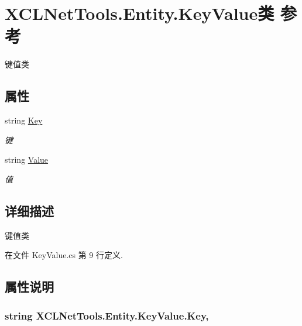 \hypertarget{class_x_c_l_net_tools_1_1_entity_1_1_key_value}{\section{X\-C\-L\-Net\-Tools.\-Entity.\-Key\-Value类 参考}
\label{class_x_c_l_net_tools_1_1_entity_1_1_key_value}
}


键值类  


\subsection*{属性}
\begin{DoxyCompactItemize}
\item 
string \hyperlink{class_x_c_l_net_tools_1_1_entity_1_1_key_value_a33e2f7bfdcc6a1dce560304a4450cf08}{Key}
\begin{DoxyCompactList}\small\item\em 键 \end{DoxyCompactList}\item 
string \hyperlink{class_x_c_l_net_tools_1_1_entity_1_1_key_value_a9ec3c76143930f64c1e0de2074514bae}{Value}
\begin{DoxyCompactList}\small\item\em 值 \end{DoxyCompactList}\end{DoxyCompactItemize}


\subsection{详细描述}
键值类 



在文件 Key\-Value.\-cs 第 9 行定义.



\subsection{属性说明}
\hypertarget{class_x_c_l_net_tools_1_1_entity_1_1_key_value_a33e2f7bfdcc6a1dce560304a4450cf08}{
\subsubsection[{Key}]{\setlength{\rightskip}{0pt plus 5cm}string X\-C\-L\-Net\-Tools.\-Entity.\-Key\-Value.\-Key\hspace{0.3cm}{\ttfamily [get]}, {\ttfamily [set]}}}\label{class_x_c_l_net_tools_1_1_entity_1_1_key_value_a33e2f7bfdcc6a1dce560304a4450cf08}


